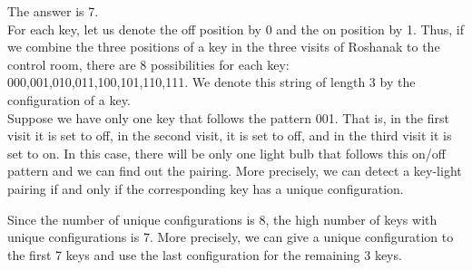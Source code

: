 \begin{solution}
The answer is  7.\\[0.2cm]

For each key, let us denote the off position by 0 and the on position by 1. Thus, if we combine the three positions of a key in the three visits of Roshanak to the control room, there are 8 possibilities for each key: 000,001,010,011,100,101,110,111. We denote this string of length 3 by the configuration of a key.\\[0.2cm]

Suppose we have only one key that follows the pattern 001. That is, in the first visit it is set to off, in the second visit, it is set to off, and in the third visit it is set to on. In this case, there will be only one light bulb that follows this on/off pattern and we can find out the pairing. More precisely, we can detect a key-light pairing if and only if the corresponding key has a unique configuration.

Since the number of unique configurations is 8, the high number of keys with unique configurations is 7. More precisely, we can give a unique configuration to the first 7 keys and use the last configuration for the remaining 3 keys. 
\end{solution}